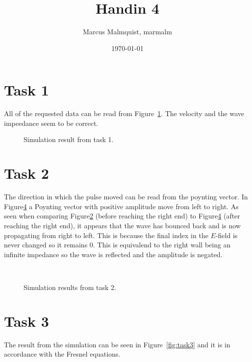 \documentclass[12pt,a4paper]{article}
\title{Handin 4}
\author{Marcus Malmquist, marmalm}
\date{\today}
\begin{document}
\maketitle

\section{Task 1}\label{sec:1}
All of the requested data can be read from Figure~\ref{fig:task1}. The velocity and the wave impeedance seem to be correct.
\begin{figure}
  \centering
  \noindent\makebox[\textwidth]{\scalebox{0.90}{}}
  \caption{Simulation result from task 1.}
  \label{fig:task1}
\end{figure}

\section{Task 2}\label{sec:2}
The direction in which the pulse moved can be read from the poynting vector. In Figure\ref{fig:task2} a Poynting vector with positive amplitude move from left to right. As seen when comparing Figure\ref{fig:task2_1} (before reaching the right end) to Figure\ref{fig:task2} (after reaching the right end), it appears that the wave has bounced back and is now propagating from right to left. This is because the final index in the $E$-field is never changed so it remains 0. This is equivalend to the right wall being an infinite impedance so the wave is reflected and the amplitude is negated.
\begin{figure}
  \centering
    \begin{subfigure}[b]{0.5\textwidth}
        \noindent\makebox[\textwidth]{\scalebox{0.5}{}}
        \label{fig:task2_1}
    \end{subfigure}\\
    \begin{subfigure}[b]{0.5\textwidth}
        \noindent\makebox[\textwidth]{\scalebox{0.5}{}}
        \label{fig:task2_2}
    \end{subfigure}
  \caption{Simulation results from task 2.}
  \label{fig:task2}
\end{figure}

\section{Task 3}\label{sec:3}
The result from the simulation can be seen in Figure~\ref{fig:task3} and it is in accordance with the Fresnel equations.
\end{document}
